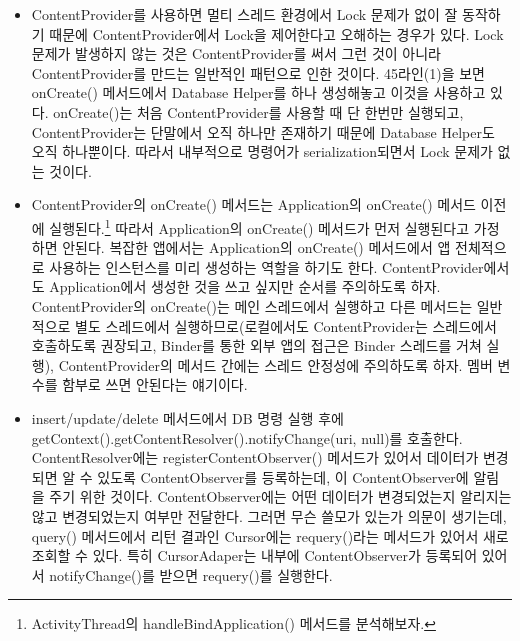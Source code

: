 \begin{itemize}
\item ContentProvider를 사용하면 멀티 스레드 환경에서 Lock 문제가 없이 잘 동작하기 때문에 ContentProvider에서 Lock을 제어한다고 오해하는 경우가 있다. 
Lock 문제가 발생하지 않는 것은 ContentProvider를 써서 그런 것이 아니라 ContentProvider를 만드는 일반적인 패턴으로 인한 것이다.
45라인(1)을 보면 onCreate() 메서드에서 Database Helper를 하나 생성해놓고 이것을 사용하고 있다.
onCreate()는 처음 ContentProvider를 사용할 때 단 한번만 실행되고, ContentProvider는 단말에서 오직 하나만 존재하기 때문에 Database Helper도 오직 하나뿐이다. 따라서 내부적으로 명령어가 serialization되면서 Lock 문제가 없는 것이다.

\item ContentProvider의 onCreate() 메서드는 Application의 onCreate() 메서드 이전에 실행된다.\footnote{ActivityThread의 handleBindApplication() 메서드를 분석해보자.}
따라서 Application의 onCreate() 메서드가 먼저 실행된다고 가정하면 안된다.
복잡한 앱에서는 Application의 onCreate() 메서드에서 앱 전체적으로 사용하는 인스턴스를 미리 생성하는 역할을 하기도 한다. ContentProvider에서도 Application에서 생성한 것을 쓰고 싶지만 순서를 주의하도록 하자.
ContentProvider의 onCreate()는 메인 스레드에서 실행하고 다른 메서드는 일반적으로 별도 스레드에서 실행하므로(로컬에서도 ContentProvider는 스레드에서 호출하도록 권장되고, Binder를 통한 외부 앱의 접근은 Binder 스레드를 거쳐 실행), ContentProvider의 메서드 간에는 스레드 안정성에 주의하도록 하자. 멤버 변수를 함부로 쓰면 안된다는 얘기이다.

\item insert/update/delete 메서드에서 DB 명령 실행 후에 getContext().getContentResolver().not\-ifyChange\-(uri, null)를 호출한다. ContentResolver에는 registerContentObserver() 메서드가 있어서 데이터가 변경되면 알 수 있도록 ContentObserver를 등록하는데, 이 ContentObserver에 알림을 주기 위한 것이다. 
ContentObserver에는 어떤 데이터가 변경되었는지 알리지는 않고 변경되었는지 여부만 전달한다. 
그러면 무슨 쓸모가 있는가 의문이 생기는데,
query() 메서드에서 리턴 결과인 Cursor에는 requery()라는 메서드가 있어서 새로 조회할 수 있다. 특히 CursorAdaper는 내부에 ContentObserver가 등록되어 있어서 notifyChange()를 받으면 requery()를 실행한다.

\end{itemize}

